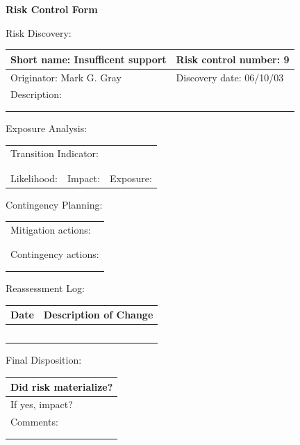 \documentclass{article}
\begin{document}
\begin{center}\Large\bf
Risk Control Form
\end{center}
\vspace{24pt}

Risk Discovery:

\begin{tabular}{|p{211pt}|p{211pt}|} \hline
Short name: Insufficent support & Risk control number: 9\\ \hline
Originator: Mark G. Gray & Discovery date: 06/10/03\\ \hline
\multicolumn{2}{|l|}{Description:} \\
\multicolumn{2}{|l|}{\mbox{}} \\
\multicolumn{2}{|l|}{\mbox{}} \\ \hline
\end{tabular}
\vspace{24pt}

Exposure Analysis:

\begin{tabular}{|p{138pt}|p{138pt}|p{138pt}|} \hline
\multicolumn{3}{|l|}{Transition Indicator:} \\
\multicolumn{3}{|l|}{\mbox{}} \\
\multicolumn{3}{|l|}{\mbox{}} \\ \hline
Likelihood: & Impact: & Exposure: \\ \hline
\end{tabular}
\vspace{24pt}

Contingency Planning:

\begin{tabular}{|p{433pt}|} \hline
Mitigation actions: \\
\mbox{} \\
\mbox{} \\ \hline
Contingency actions: \\
\mbox{} \\
\mbox{} \\ \hline
\end{tabular}
\vspace{24pt}

Reassessment Log:

\begin{tabular}{|p{72pt}|p{351pt}|} \hline
Date & Description of Change \\ \hline
\mbox{} & \mbox{} \\ \hline
\mbox{} & \mbox{} \\ \hline
\mbox{} & \mbox{} \\ \hline
\mbox{} & \mbox{} \\ \hline
\mbox{} & \mbox{} \\ \hline
\end{tabular}
\vspace{24pt}

Final Disposition:

\begin{tabular}{|p{433pt}|} \hline
Did risk materialize? \\ \hline
If yes, impact? \\ \hline
Comments: \\
\mbox{} \\
\mbox{} \\ \hline
\end{tabular}
\end{document}
